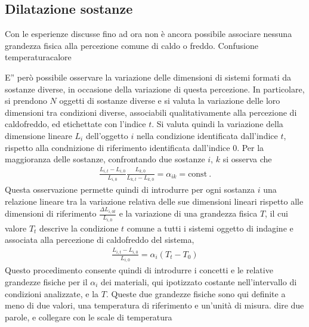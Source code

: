 \documentclass[letterpaper,10pt,italian]{jupyterBook}
\begin{document}
\subsection{Dilatazione sostanze}
\label{\detokenize{ch/thermodynamics/foundation-experiments:dilatazione-sostanze}}
\sphinxAtStartPar
Con le esperienze discusse fino ad ora non è ancora possibile associare nessuna grandezza fisica alla percezione comune di caldo o freddo. Confusione temperatura\sphinxhyphen{}calore  

\sphinxAtStartPar
E” però possibile osservare la variazione delle dimensioni di sistemi formati da sostanze diverse, in occasione della variazione di questa percezione.
In particolare, si prendono \(N\) oggetti di sostanze diverse e si valuta la variazione delle loro dimensioni tra condizioni diverse, associabili qualitativamente alla percezione di caldo\sphinxhyphen{}freddo, ed etichettate con l’indice \(t\). Si valuta quindi la variazione della dimensione lineare \(L_i\) dell’oggetto \(i\) nella condizione identificata dall’indice \(t\), rispetto alla condnizione di riferimento identificata dall’indice \(0\). Per la maggioranza delle sostanze, confrontando due sostanze \(i\), \(k\) si osserva che
\begin{equation*}
\begin{split}\frac{L_{i,t} - L_{i,0}}{L_{i,0}} \frac{L_{k,0}}{L_{k,t}- L_{k,0}} = \alpha_{ik} = \text{const} \ .\end{split}
\end{equation*}
\sphinxAtStartPar
Questa osservazione permette quindi di introdurre per ogni sostanza \(i\) una relazione lineare tra la variazione relativa delle sue dimensioni lineari rispetto alle dimensioni di riferimento \(\frac{\Delta L_{i, 0t}}{L_{i,0}}\) e la variazione di una grandezza fisica \(T\), il cui valore \(T_t\) descrive la condizione \(t\) comune a tutti i sistemi oggetto di indagine e associata alla percezione di caldo\sphinxhyphen{}freddo del sistema,
\begin{equation*}
\begin{split}\frac{L_{i,t}-L_{i,0}}{L_{i,0}} = \alpha_i (T_t-T_0)\end{split}
\end{equation*}
\sphinxAtStartPar
Questo procedimento consente quindi di introdurre i concetti e le relative grandezze fisiche per il  \(\alpha_i\) dei materiali, qui ipotizzato costante nell’intervallo di condizioni analizzate, e la  \(T\). Queste due grandezze fisiche sono qui definite a meno di due valori, una temperatura di riferimento e un’unità di misura.  dire due parole, e collegare con le scale di temperatura
\end{document}
